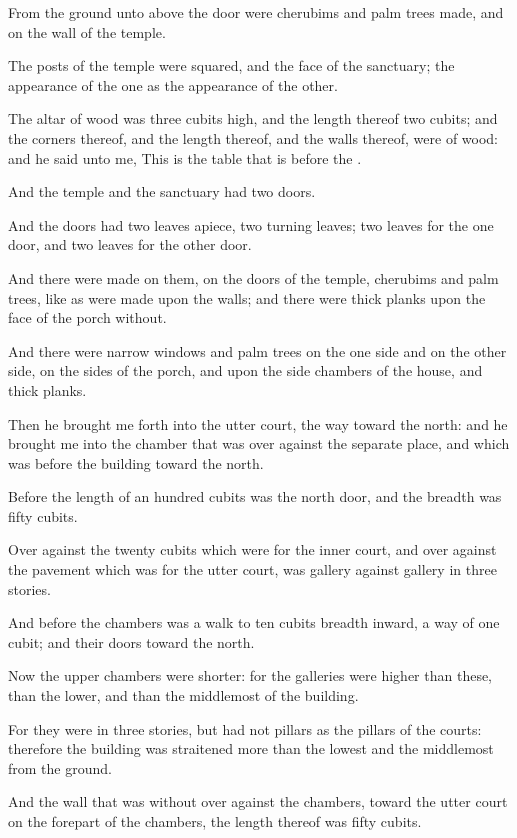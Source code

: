 \Verse From the ground unto above the door were cherubims and palm trees made, and on the wall of the temple.

\Verse The posts of the temple were squared, and the face of the sanctuary; the appearance of the one as the appearance of the other.

\Verse The altar of wood was three cubits high, and the length thereof two cubits; and the corners thereof, and the length thereof, and the walls thereof, were of wood: and he said unto me, This is the table that is before the \LORD.

\Verse And the temple and the sanctuary had two doors.

\Verse And the doors had two leaves apiece, two turning leaves; two leaves for the one door, and two leaves for the other door.

\Verse And there were made on them, on the doors of the temple, cherubims and palm trees, like as were made upon the walls; and there were thick planks upon the face of the porch without.

\Verse And there were narrow windows and palm trees on the one side and on the other side, on the sides of the porch, and upon the side chambers of the house, and thick planks.


\Chapter
\Verse Then he brought me forth into the utter court, the way toward the north: and he brought me into the chamber that was over against the separate place, and which was before the building toward the north.

\Verse Before the length of an hundred cubits was the north door, and the breadth was fifty cubits.

\Verse Over against the twenty cubits which were for the inner court, and over against the pavement which was for the utter court, was gallery against gallery in three stories.

\Verse And before the chambers was a walk to ten cubits breadth inward, a way of one cubit; and their doors toward the north.

\Verse Now the upper chambers were shorter: for the galleries were higher than these, than the lower, and than the middlemost of the building.

\Verse For they were in three stories, but had not pillars as the pillars of the courts: therefore the building was straitened more than the lowest and the middlemost from the ground.

\Verse And the wall that was without over against the chambers, toward the utter court on the forepart of the chambers, the length thereof was fifty cubits.


